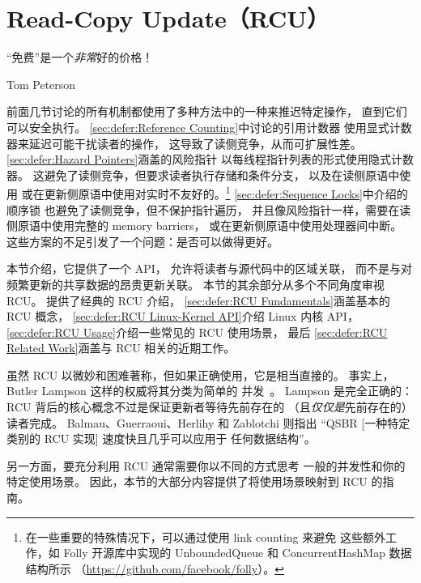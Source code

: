 
\section{Read-Copy Update（RCU）}
\label{sec:defer:Read-Copy Update (RCU)}
%
\epigraph{``免费''是一个\emph{非常}好的价格！}{Tom Peterson}

前面几节讨论的所有机制都使用了多种方法中的一种来推迟特定操作，
直到它们可以安全执行。
\cref{sec:defer:Reference Counting}中讨论的引用计数器
使用显式计数器来延迟可能干扰读者的操作，
这导致了读侧竞争，从而可扩展性差。
\cref{sec:defer:Hazard Pointers}涵盖的风险指针
以每线程指针列表的形式使用隐式计数器。
这避免了读侧竞争，但要求读者执行存储和条件分支，
以及在读侧原语中使用
或在更新侧原语中使用对实时不友好的。\footnote{
	在一些重要的特殊情况下，可以通过使用 link counting 来避免
	这些额外工作，如 Folly 开源库中实现的 UnboundedQueue 和
	ConcurrentHashMap 数据结构所示
	（\url{https://github.com/facebook/folly}）。}
\cref{sec:defer:Sequence Locks}中介绍的顺序锁
也避免了读侧竞争，但不保护指针遍历，
并且像风险指针一样，需要在读侧原语中使用完整的 memory barriers，
或在更新侧原语中使用处理器间中断。
这些方案的不足引发了一个问题：是否可以做得更好。

本节介绍，它提供了一个 API，
允许将读者与源代码中的区域关联，
而不是与对频繁更新的共享数据的昂贵更新关联。
本节的其余部分从多个不同角度审视 RCU。
提供了经典的 RCU 介绍，
\cref{sec:defer:RCU Fundamentals}涵盖基本的 RCU 概念，
\cref{sec:defer:RCU Linux-Kernel API}介绍 Linux 内核 API，
\cref{sec:defer:RCU Usage}介绍一些常见的 RCU 使用场景，
最后
\cref{sec:defer:RCU Related Work}涵盖与 RCU 相关的近期工作。

虽然 RCU 以微妙和困难著称，但如果正确使用，它是相当直接的。
事实上，Butler Lampson 这样的权威将其分类为简单的
并发~\cite[Chapter 3]{ButlerLampson2022ProgrammingConcurrentSystems}。
Lampson 是完全正确的：
RCU 背后的核心概念不过是保证更新者等待先前存在的
（且\emph{仅仅是}先前存在的）读者完成。
Balmau、Guerraoui、Herlihy 和 Zablotchi 则指出
``QSBR [一种特定类别的 RCU 实现] 速度快且几乎可以应用于
任何数据结构''。

另一方面，要充分利用 RCU 通常需要你以不同的方式思考
一般的并发性和你的特定使用场景。
因此，本节的大部分内容提供了将使用场景映射到 RCU 的指南。

\QuickQuizEnd






